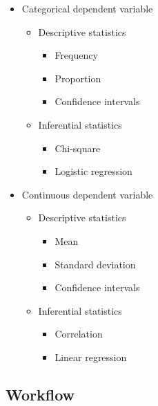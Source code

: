 \documentclass[
  letterpaper,
]{latex/krantz}
\providecommand{\tightlist}{%
  \setlength{\itemsep}{0pt}\setlength{\parskip}{0pt}}\usepackage{longtable,booktabs,array}
\begin{document}
\begin{itemize}
\tightlist
\item
  Categorical dependent variable

  \begin{itemize}
  \tightlist
  \item
    Descriptive statistics

    \begin{itemize}
    \tightlist
    \item
      Frequency
    \item
      Proportion
    \item
      Confidence intervals
    \end{itemize}
  \item
    Inferential statistics

    \begin{itemize}
    \tightlist
    \item
      Chi-square
    \item
      Logistic regression
    \end{itemize}
  \end{itemize}
\item
  Continuous dependent variable

  \begin{itemize}
  \tightlist
  \item
    Descriptive statistics

    \begin{itemize}
    \tightlist
    \item
      Mean
    \item
      Standard deviation
    \item
      Confidence intervals
    \end{itemize}
  \item
    Inferential statistics

    \begin{itemize}
    \tightlist
    \item
      Correlation
    \item
      Linear regression
    \end{itemize}
  \end{itemize}
\end{itemize}

\hypertarget{ida-workflow}{%
\subsection{Workflow}\label{ida-workflow}}
\end{document}
